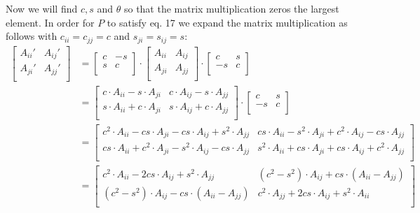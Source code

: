 \documentclass[12pt,twoside]{article}
\begin{document}
Now we will find $c, s$ and $\theta$ so that the matrix multiplication zeros the largest element. In order for $P$ to satisfy eq. 17 we expand the matrix multiplication as follows with $c_{ii}=c_{jj}=c$ and $s_{ji}=s_{ij}=s$:\\
\begin{equation}
\begin{split}
\begin{bmatrix}
     A_{ii}' & A_{ij}' \\
    A_{ji}' & A_{jj}' \\
\end{bmatrix}
 &=
\begin{bmatrix}
     c & -s \\
    s & c \\
\end{bmatrix}
\cdot
\begin{bmatrix}
     A_{ii} & A_{ij} \\
    A_{ji} & A_{jj} \\
\end{bmatrix}
\cdot
\begin{bmatrix}
     c & s \\
     -s & c \\
\end{bmatrix}\\
&=\begin{bmatrix}
     c\cdot A_{ii} - s\cdot A_{ji} & c\cdot A_{ij} - s\cdot A_{jj} \\
     s\cdot A_{ii} + c\cdot A_{ji} & s\cdot A_{ij} + c\cdot A_{jj} \\
\end{bmatrix}
\cdot
\begin{bmatrix}
     c & s \\
     -s & c \\
\end{bmatrix}\\
&=\begin{bmatrix}
c^2\cdot A_{ii} - cs\cdot A_{ji} - cs\cdot A_{ij} + s^2\cdot A_{jj} & cs\cdot A_{ii} - s^2\cdot A_{ji} + c^2\cdot A_{ij} - cs\cdot A_{jj}\\
cs\cdot A_{ii} + c^2\cdot A_{ji} - s^2\cdot A_{ij} - cs\cdot A_{jj} & s^2\cdot A_{ii} + cs\cdot A_{ji} + cs\cdot A_{ij} + c^2\cdot A_{jj}\\
\end{bmatrix}\\
&=\begin{bmatrix}
c^2\cdot A_{ii} - 2cs\cdot A_{ij}  + s^2\cdot A_{jj} & (c^2-s^2)\cdot A_{ij}  + cs\cdot (A_{ii} - A_{jj})\\
(c^2-s^2)\cdot A_{ij}  - cs\cdot (A_{ii} - A_{jj}) & c^2\cdot A_{jj} + 2cs\cdot A_{ij} + s^2\cdot A_{ii}\\
\end{bmatrix}
\end{split}
\end{equation}
\end{document}
